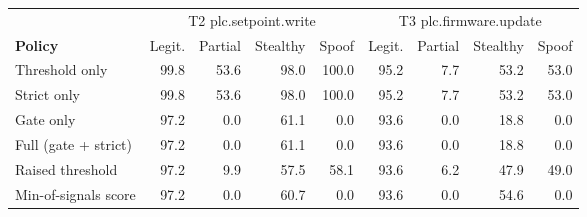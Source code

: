 \begin{tabular}{@{}lrrrrrrrr@{}}
\toprule
& \multicolumn{4}{c}{T2 plc.setpoint.write} & \multicolumn{4}{c}{T3 plc.firmware.update} \\
\textbf{Policy} & Legit. & Partial & Stealthy & Spoof & Legit. & Partial & Stealthy & Spoof \\
\midrule
Threshold only & 99.8 & 53.6 & 98.0 & 100.0 & 95.2 & 7.7 & 53.2 & 53.0 \\
Strict only & 99.8 & 53.6 & 98.0 & 100.0 & 95.2 & 7.7 & 53.2 & 53.0 \\
Gate only & 97.2 & 0.0 & 61.1 & 0.0 & 93.6 & 0.0 & 18.8 & 0.0 \\
Full (gate + strict) & 97.2 & 0.0 & 61.1 & 0.0 & 93.6 & 0.0 & 18.8 & 0.0 \\
Raised threshold & 97.2 & 9.9 & 57.5 & 58.1 & 93.6 & 6.2 & 47.9 & 49.0 \\
Min-of-signals score & 97.2 & 0.0 & 60.7 & 0.0 & 93.6 & 0.0 & 54.6 & 0.0 \\
\bottomrule
\end{tabular}